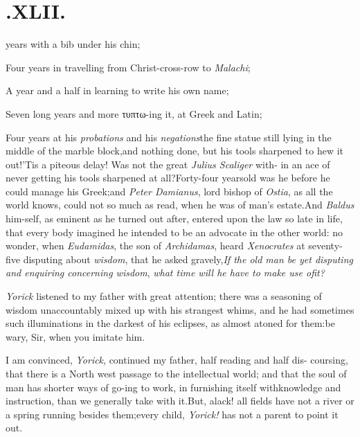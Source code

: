 \documentclass[twoside]{article}
\begin{document}
\section{.\enspace  XLII.}

years with a bib
under his chin;

Four years in travelling from Christ-cross-row to
\textit{Malachi};

A year and a half in learning to write his own name;

Seven long years and more τυπτω-ing it, at Greek and Latin;

Four years at his \textit{probations} and his
\textit{negations}\tsk the fine statue still lying in
the middle of
the marble block,\tsk and nothing done, but his tools sharpened
to hew it out!\tsk ’Tis a piteous delay!\tsk\break
Was not the great \textit{Julius Scaliger} with-\break
in an ace of never getting his tools\break
sharpened at all?\tsh Forty-four years\break old was he
before he could manage his Greek;\tsh and \textit{Peter Damianus},
lord bishop of \textit{Ostia}, as all the world knows, could not so
much as read, when he was of man’s estate.\tsh And
\textit{Baldus} him-\break self, as eminent
as he turned out after,\break
entered
upon the law so late in life, that every body imagined he intended to be an advocate in
the other world: no\break
wonder, when \textit{Eudamidas}, the son of\break
\textit{Archidamas}, heard \textit{Xenocrates} at seventy-five
disputing about \textit{wisdom}, that he\break
asked gravely,\tsk \textit{If the old man be yet disputing and enquiring concerning
wisdom},
\textit{\tsk what time will he have to make
use of\break it?}

\textit{Yorick} listened to my father with great attention; there
was a seasoning of wisdom unaccountably mixed up with his strangest
whims, and he had sometimes such illuminations in the darkest of
his eclipses, as almost atoned for them:\tsk\break be wary, Sir, when
you imitate him.

I am convinced, \textit{Yorick}, continued\break
my father, half reading and half dis-\break
coursing, that there is a North west passage to the
intellectual world; and that the soul of man has shorter ways of
go-\break ing to work, in furnishing itself with\break knowledge and instruction,
than we generally take with it.\tsh But, alack! all fields
have not a river or a spring running besides them;\tsk every
child, \textit{Yorick!} has not a parent to point it out.
\end{document}
